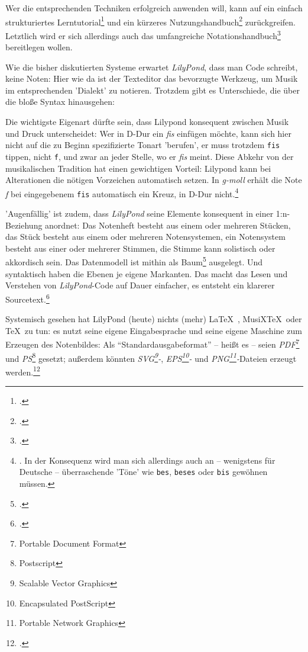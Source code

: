 Wer die entsprechenden Techniken erfolgreich anwenden will, kann auf ein einfach
strukturiertes Lerntutorial\footcite[vgl.][20ff]{LilyPond2018b} und ein kürzeres
Nutzungshandbuch\footcite[vgl.][1ff]{LilyPond2018e} zurückgreifen. Letztlich
wird er sich allerdings auch das umfangreiche
Notationshandbuch\footcite[vgl.][1ff]{LilyPond2018c} bereitlegen wollen.

Wie die bisher diskutierten Systeme erwartet \textit{LilyPond}, dass man Code
schreibt, keine Noten: Hier wie da ist der Texteditor das bevorzugte Werkzeug,
um Musik im entsprechenden 'Dialekt' zu notieren. Trotzdem gibt es Unterschiede,
die über die bloße Syntax hinausgehen:

Die wichtigste Eigenart dürfte sein, dass Lilypond konsequent zwischen Musik und
Druck unterscheidet: Wer in D-Dur ein \textit{fis} einfügen möchte, kann sich
hier nicht auf die zu Beginn spezifizierte Tonart 'berufen', er muss trotzdem
\texttt{fis} tippen, nicht \texttt{f}, und zwar an jeder Stelle, wo er
\textit{fis} meint. Diese Abkehr von der musikalischen Tradition hat einen
gewichtigen Vorteil: Lilypond kann bei Alterationen die nötigen Vorzeichen
automatisch setzen. In \textit{g-moll} erhält die Note \textit{f} bei
eingegebenem \texttt{fis} automatisch ein Kreuz, in D-Dur
nicht.\footnote{\cite[vgl.][21]{LilyPond2018b}. In der Konsequenz wird man sich
allerdings auch an -- wenigstens für Deutsche -- überraschende 'Töne' wie
\texttt{bes}, \texttt{beses} oder \texttt{bis} gewöhnen müssen.}

'Augenfällig' ist zudem, dass \textit{LilyPond} seine Elemente konsequent in
einer 1:n-Beziehung anordnet: Das Notenheft besteht aus einem oder mehreren
Stücken, das Stück besteht aus einem oder mehreren Notensystemen, ein
Notensystem besteht aus einer oder mehrerer Stimmen, die Stimme kann solistisch
oder akkordisch sein. Das Datenmodell ist mithin als Baum\footcite[vgl.][\nopage
wp.]{WpedBaum2019a} ausgelegt. Und syntaktisch haben die Ebenen je eigene
Markanten. Das macht das Lesen und Verstehen von \textit{LilyPond}-Code auf
Dauer einfacher, es entsteht ein klarerer
Sourcetext.\footcite[vgl.][40ff]{LilyPond2018b}

Systemisch gesehen hat LilyPond (heute) nichts (mehr) \LaTeX\ , MusiX\TeX\ oder
\TeX\ zu tun: es nutzt seine eigene Eingabesprache und seine eigene Maschine zum
Erzeugen des Notenbildes: Als \enquote{Standardausgabeformat} -- heißt es --
seien \textit{PDF}\footnote{Portable Document Format} und
\textit{PS}\footnote{Postscript} gesetzt; außerdem könnten
\textit{SVG\footnote{Scalable Vector Graphics}-}, \textit{EPS\footnote{Encapsulated
PostScript}-} und \textit{PNG\footnote{Portable Network Graphics}-}Dateien erzeugt
werden.\footcite[vgl.][481]{LilyPond2018c}

